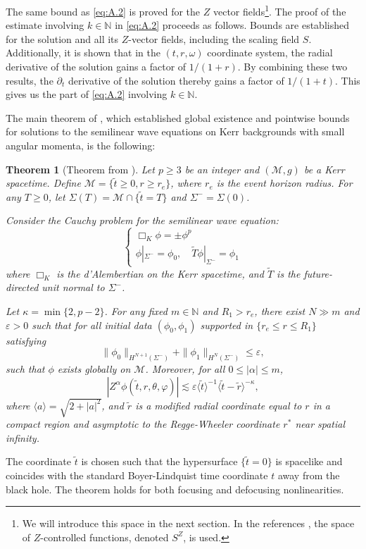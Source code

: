 \documentclass[10pt,a4paper,reqno]{amsart}
\let\pminus\pm
\renewcommand{\pm}{\phi_{\le m}}
\newtheorem{theorem}{Theorem}[section]
\theoremstyle{definition}
\theoremstyle{remark}
\numberwithin{equation}{section}
\newcommand{\N}{{\mathbb N}}
\begin{document}
The same bound as \eqref{eq:A.2} is proved for the $Z$ vector fields\footnote{We will introduce this space in the next section. In the references \cite{Looi22, Looi22.2, Toh2022}, the space of $ Z $-controlled functions, denoted $ S^Z $, is used. }. 
The proof of the estimate involving $k \in \mathbb{N}$ in \eqref{eq:A.2} proceeds as follows. Bounds are established for the solution and all its $ Z $-vector fields, including the scaling field $ S $. Additionally, it is shown that in the $(t, r, \omega)$ coordinate system, the radial derivative of the solution gains a factor of $ 1/(1+r) $. By combining these two results, the $\partial_t$ derivative of the solution thereby gains a factor of $ 1/(1+t) $. This gives us the part of \eqref{eq:A.2} involving $k \in \N$.



The main theorem of \cite{Toh2022}, which established global existence and pointwise bounds for solutions to the semilinear wave equations on Kerr backgrounds with small angular momenta, is the following:

\begin{theorem}[Theorem from \cite{Toh2022}]\label{thm:Toh2022}
Let $p \geq 3$ be an integer and $(\mathcal{M}, g)$ be a Kerr spacetime. Define $\mathcal{M} = \{ \tilde{t} \geq 0, r \geq r_e \}$, where $r_e$ is the event horizon radius. For any $T \geq 0$, let $\Sigma(T) = \mathcal{M} \cap \{ \tilde{t} = T \}$ and $\Sigma^- = \Sigma(0)$. 

Consider the Cauchy problem for the semilinear wave equation:
\begin{equation}
\begin{cases}
\Box_K \phi = \pminus \phi^p \\
\phi |_{\Sigma^-} = \phi_0, \quad \tilde{T} \phi |_{\Sigma^-} = \phi_1
\end{cases}
\end{equation}
where $\Box_K$ is the d'Alembertian on the Kerr spacetime, and $\tilde{T}$ is the future-directed unit normal to $\Sigma^-$.

Let $\kappa = \min\{2, p-2\}$. For any fixed $m \in \mathbb{N}$ and $R_1 > r_e$, there exist $N \gg m$ and $\varepsilon > 0$ such that for all initial data $(\phi_0, \phi_1)$ supported in $\{r_e \leq r \leq R_1\}$ satisfying
\[
\|\phi_0\|_{H^{N+1}(\Sigma^-)} + \|\phi_1\|_{H^N(\Sigma^-)} \leq \varepsilon,
\]
such that $\phi$ exists globally on $\mathcal{M}$. Moreover, for all $0 \leq |\alpha| \leq m$, 
\[
|Z^\alpha \phi(\tilde{t},r,\theta,\varphi)| \lesssim \varepsilon \langle \tilde{t} \rangle^{-1} \langle \tilde{t} - \tilde{r} \rangle^{-\kappa},
\]
where $\langle a \rangle = \sqrt{2 + |a|^2}$, and $\tilde{r}$ is a modified radial coordinate equal to $r$ in a compact region and asymptotic to the Regge-Wheeler coordinate $r^*$ near spatial infinity. 
\end{theorem}
The coordinate $\tilde{t}$ is chosen such that the hypersurface $\{\tilde{t} = 0\}$ is spacelike and coincides with the standard Boyer-Lindquist time coordinate $t$ away from the black hole. The theorem holds for both focusing and defocusing nonlinearities.
\end{document}

